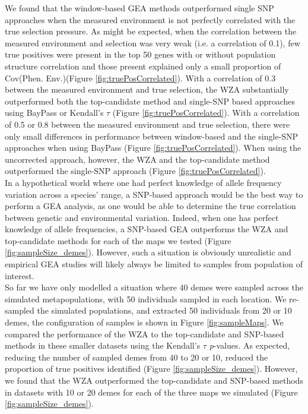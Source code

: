 \documentclass[10pt,twoside,lineno, twocolumn]{GSA_format}
\begin{document}
We found that the window-based GEA methods outperformed single SNP approaches when the measured environment is not perfectly correlated with the true selection pressure. As might be expected, when the correlation between the measured environment and selection was very weak (i.e. a correlation of 0.1), few true positives were present in the top 50 genes with or without population structure correlation and those present explained only a small proportion of Cov(Phen. Env.)(Figure \ref{fig:truePosCorrelated}). With a correlation of 0.3 between the measured environment and true selection, the WZA substantially outperformed both the top-candidate method and single-SNP based approaches using BayPass or Kendall's $\tau$ (Figure \ref{fig:truePosCorrelated}). With a correlation of 0.5 or 0.8 between the measured environment and true selection, there were only small differences in performance between window-based and the single-SNP approaches when using BayPass (Figure \ref{fig:truePosCorrelated}). When using the uncorrected approach, however, the WZA and the top-candidate method outperformed the single-SNP approach (Figure \ref{fig:truePosCorrelated}). \\

In a hypothetical world where one had perfect knowledge of allele frequency variation across a species' range, a SNP-based approach would be the best way to perform a GEA analysis, as one would be able to determine the true correlation between genetic and environmental variation. Indeed, when one has perfect knowledge of allele frequencies, a SNP-based GEA outperforms the WZA and top-candidate methods for each of the maps we tested (Figure \ref{fig:sampleSize_demes}). However, such a situation is obviously unrealistic and  empirical GEA studies will likely always be limited to samples from population of interest. \\

So far we have only modelled a situation where 40 demes were sampled across the simulated metapopulations, with 50 individuals sampled in each location. We re-sampled the simulated populations, and extracted 50 individuals from 20 or 10 demes, the configuration of samples is shown in Figure \ref{fig:sampleMaps}. We compared the performance of the WZA to the top-candidate and SNP-based methods in these smaller datasets using the Kendall's $\tau$ \textit{p}-values. As expected, reducing the number of sampled demes from 40 to 20 or 10, reduced the proportion of true positives identified (Figure \ref{fig:sampleSize_demes}). However, we found that the WZA outperformed the top-candidate and SNP-based methods in datasets with 10 or 20 demes for each of the three maps we simulated (Figure \ref{fig:sampleSize_demes}).
\end{document}
